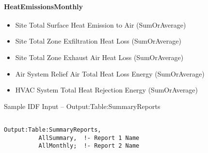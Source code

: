 \paragraph{HeatEmissionsMonthly}\label{HeatEmissionsMonthly}

\begin{itemize}
\item
  Site Total Surface Heat Emission to Air (SumOrAverage)
\item
  Site Total Zone Exfiltration Heat Loss (SumOrAverage)
\item
  Site Total Zone Exhaust Air Heat Loss (SumOrAverage)
\item
  Air System Relief Air Total Heat Loss Energy (SumOrAverage)
\item
  HVAC System Total Heat Rejection Energy (SumOrAverage)
\end{itemize}

Sample IDF Input -- Output:Table:SummaryReports

\begin{lstlisting}

Output:Table:SummaryReports,
          AllSummary,  !- Report 1 Name
          AllMonthly;  !- Report 2 Name
\end{lstlisting}